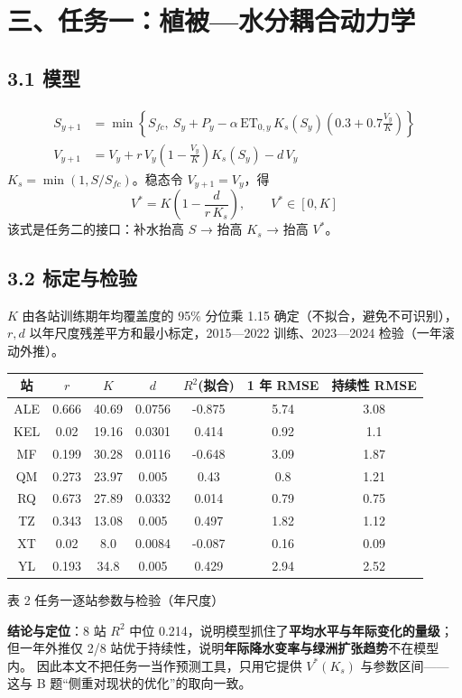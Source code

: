 \documentclass[11pt,a4paper]{ctexart}
\begin{document}
\section*{三、任务一：植被—水分耦合动力学}
\subsection*{3.1 模型}
\begin{align}
S_{y+1} &= \min\!\left\{S_{fc},\ S_y + P_y - \alpha\,\mathrm{ET}_{0,y}\,K_s(S_y)\left(0.3+0.7\frac{V_y}{K}\right)\right\}\\
V_{y+1} &= V_y + r\,V_y\left(1-\frac{V_y}{K}\right)K_s(S_y) - d\,V_y
\end{align}
$K_s=\min(1,S/S_{fc})$。稳态令 $V_{y+1}=V_y$，得
\begin{equation}
V^{*}=K\left(1-\frac{d}{r\,K_s}\right),\qquad V^*\in[0,K]
\end{equation}
该式是任务二的接口：补水抬高 $S$ → 抬高 $K_s$ → 抬高 $V^*$。

\subsection*{3.2 标定与检验}
$K$ 由各站训练期年均覆盖度的 95\% 分位乘 1.15 确定（不拟合，避免不可识别），
$r,d$ 以年尺度残差平方和最小标定，2015—2022 训练、2023—2024 检验（一年滚动外推）。
\begin{table}[H]\centering\small
\begin{tabular}{|c|c|c|c|c|c|c|}
\toprule
站 & $r$ & $K$ & $d$ & $R^2$(拟合) & 1 年 RMSE & 持续性 RMSE \\
\midrule
ALE & 0.666 & 40.69 & 0.0756 & -0.875 & 5.74 & 3.08 \\
KEL & 0.02 & 19.16 & 0.0301 & 0.414 & 0.92 & 1.1 \\
MF & 0.199 & 30.28 & 0.0116 & -0.648 & 3.09 & 1.87 \\
QM & 0.273 & 23.97 & 0.005 & 0.43 & 0.8 & 1.21 \\
RQ & 0.673 & 27.89 & 0.0332 & 0.014 & 0.79 & 0.75 \\
TZ & 0.343 & 13.08 & 0.005 & 0.497 & 1.82 & 1.12 \\
XT & 0.02 & 8.0 & 0.0084 & -0.087 & 0.16 & 0.09 \\
YL & 0.193 & 34.8 & 0.005 & 0.429 & 2.94 & 2.52 \\
\bottomrule
\end{tabular}
\begin{center}\small 表 2  任务一逐站参数与检验（年尺度）\end{center}
\end{table}
\textbf{结论与定位}：8 站 $R^2$ 中位 0.214，说明模型抓住了\textbf{平均水平与年际变化的量级}；
但一年外推仅 2/8 站优于持续性，说明\textbf{年际降水变率与绿洲扩张趋势}不在模型内。
因此本文不把任务一当作预测工具，只用它提供 $V^*(K_s)$ 与参数区间——
这与 B 题“侧重对现状的优化”的取向一致。
\end{document}
